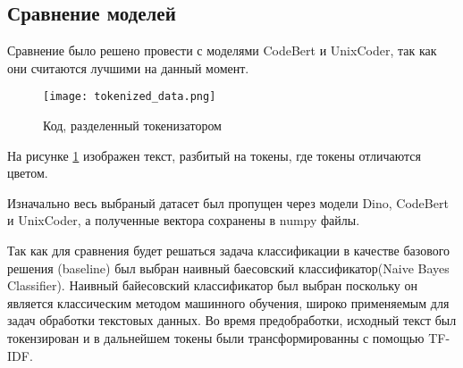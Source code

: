 \documentclass[../part_3.tex]{subfiles}
\begin{document}
\subsection{Сравнение моделей}
\par Сравнение было решено провести с моделями CodeBert\cite{feng2020codebertpretrainedmodelprogramming} и UnixCoder\cite{guo2022unixcoder}, так как они считаются лучшими на данный момент.
\begin{figure}[H]
	\centering
	\texttt{[image: tokenized\_data.png]}
	\caption{Код, разделенный токенизатором}
	\label{fig:tokenized}
\end{figure}
\par На рисунке \ref{fig:tokenized} изображен текст, разбитый на токены, где токены отличаются цветом.
\par Изначально весь выбраный датасет был пропущен через модели Dino, CodeBert и UnixCoder, а полученные вектора сохранены в numpy файлы.
\par Так как для сравнения будет решаться задача классификации в качестве базового решения (baseline) был выбран наивный баесовский классификатор(Naive Bayes Classifier). Наивный байесовский классификатор был выбран поскольку он является классическим методом машинного обучения, широко применяемым для задач обработки текстовых данных. Во время предобработки, исходный текст был токензирован и в дальнейшем токены были трансформированны с помощью TF-IDF\@.
\end{document}
